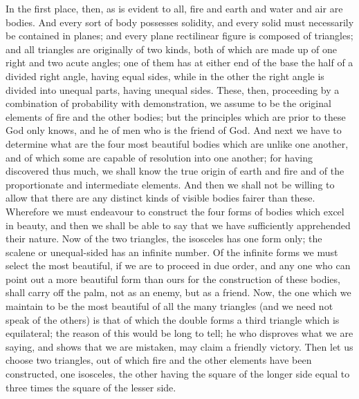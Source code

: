 \documentclass[11pt,letter]{article}
\begin{document}
\par  In the first place, then, as is evident to all, fire and earth and water and air are bodies. And every sort of body possesses solidity, and every solid must necessarily be contained in planes; and every plane rectilinear figure is composed of triangles; and all triangles are originally of two kinds, both of which are made up of one right and two acute angles; one of them has at either end of the base the half of a divided right angle, having equal sides, while in the other the right angle is divided into unequal parts, having unequal sides. These, then, proceeding by a combination of probability with demonstration, we assume to be the original elements of fire and the other bodies; but the principles which are prior to these God only knows, and he of men who is the friend of God. And next we have to determine what are the four most beautiful bodies which are unlike one another, and of which some are capable of resolution into one another; for having discovered thus much, we shall know the true origin of earth and fire and of the proportionate and intermediate elements. And then we shall not be willing to allow that there are any distinct kinds of visible bodies fairer than these. Wherefore we must endeavour to construct the four forms of bodies which excel in beauty, and then we shall be able to say that we have sufficiently apprehended their nature. Now of the two triangles, the isosceles has one form only; the scalene or unequal-sided has an infinite number. Of the infinite forms we must select the most beautiful, if we are to proceed in due order, and any one who can point out a more beautiful form than ours for the construction of these bodies, shall carry off the palm, not as an enemy, but as a friend. Now, the one which we maintain to be the most beautiful of all the many triangles (and we need not speak of the others) is that of which the double forms a third triangle which is equilateral; the reason of this would be long to tell; he who disproves what we are saying, and shows that we are mistaken, may claim a friendly victory. Then let us choose two triangles, out of which fire and the other elements have been constructed, one isosceles, the other having the square of the longer side equal to three times the square of the lesser side.
\end{document}

